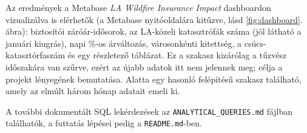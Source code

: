 \documentclass[11pt,a4paper]{article}
\begin{document}
Az eredmények a Metabase \emph{LA Wildfire Insurance Impact} dashboardon
vizualizálva is elérhetők (a Metabase nyitóoldalára kitűzve, lásd
\ref{fig:dashboard}. ábra): biztosítói záróár-idősorok, az LA-közeli
katasztrófák száma (jól látható a januári kiugrás), napi \%-os árváltozás,
városonkénti kitettség, a csúcs-katasztórfaszám és egy részletező táblázat. Ez a szakasz kizárólag a tűzvész időszakára van szűrve, ezért az újabb adatok itt nem jelennek meg; célja a projekt lényegének bemutatása. Alatta egy hasonló felépítésű szakasz található, amely az elmúlt három hónap adatait emeli ki.

A további dokumentált SQL lekérdezések az \texttt{ANALYTICAL\_QUERIES.md}
fájlban találhatók, a futtatás lépései pedig a \texttt{README.md}-ben.
\end{document}
